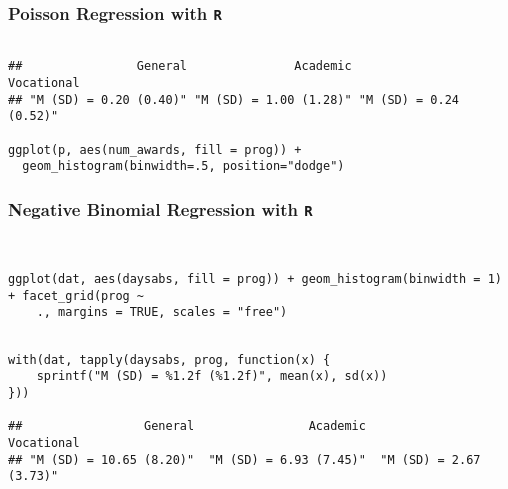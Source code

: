 \documentclass[00-GLMregslides.tex]{subfiles}
\begin{document}
\begin{frame}[fragile]
\frametitle{Poisson Regression with \texttt{R} }
\begin{framed}
\begin{verbatim}

##                General               Academic             Vocational 
## "M (SD) = 0.20 (0.40)" "M (SD) = 1.00 (1.28)" "M (SD) = 0.24 (0.52)"
 
ggplot(p, aes(num_awards, fill = prog)) +
  geom_histogram(binwidth=.5, position="dodge")

\end{verbatim}
\end{framed}
\end{frame}
\begin{frame}[fragile]
\frametitle{Negative Binomial Regression with \texttt{R} }
\begin{framed}
\begin{verbatim}


ggplot(dat, aes(daysabs, fill = prog)) + geom_histogram(binwidth = 1) + facet_grid(prog ~ 
    ., margins = TRUE, scales = "free")

\end{verbatim}
\end{framed}
\end{frame}
\begin{frame}[fragile]
\begin{framed}
\begin{verbatim}

with(dat, tapply(daysabs, prog, function(x) {
    sprintf("M (SD) = %1.2f (%1.2f)", mean(x), sd(x))
}))

##                 General                Academic              Vocational 
## "M (SD) = 10.65 (8.20)"  "M (SD) = 6.93 (7.45)"  "M (SD) = 2.67 (3.73)"


\end{verbatim}
\end{framed}
\end{frame}
\end{document}
